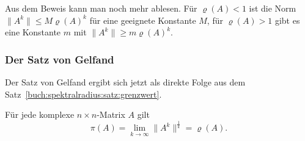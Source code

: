 Aus dem Beweis kann man noch mehr ablesen.
Für $\varrho(A)< 1$ ist die Norm $ \|A^k\| \le M \varrho(A)^k$ für eine
geeignete Konstante $M$,
für $\varrho(A) > 1$ gibt es eine Konstante $m$ mit
$\|A^k\| \ge m\varrho(A)^k$.

\subsubsection{Der Satz von Gelfand}
Der Satz von Gelfand ergibt sich jetzt als direkte Folge aus dem
Satz~\ref{buch:spektralradius:satz:grenzwert}.

\begin{satz}[Gelfand]
%
%
\label{buch:satz:gelfand}
Für jede komplexe $n\times n$-Matrix $A$ gilt
\[
\pi(A)
=
\lim_{k\to\infty}\|A^k\|^\frac1k
=
\varrho(A).
\]
\end{satz}

